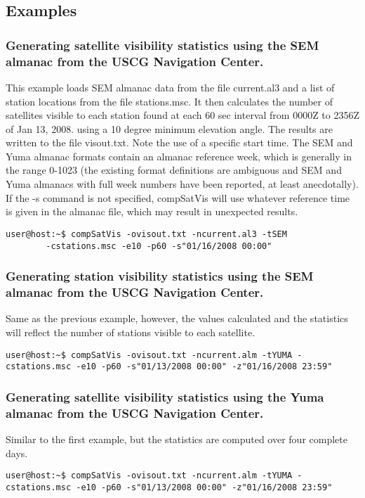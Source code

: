 \subsection{Examples}

\subsubsection{Generating satellite visibility statistics using the SEM almanac from the USCG Navigation Center.}
This example loads SEM almanac data from the file current.al3 and a list of station locations from the file stations.msc. It then calculates the number of satellites visible to each station found at each 60 sec interval from 0000Z to 2356Z of Jan 13, 2008. using a 10 degree minimum elevation angle. The results are written to the file visout.txt. Note the use of a specific start time. The SEM and Yuma almanac formats contain an almanac reference week, which is generally in the range 0-1023 (the existing format definitions are ambiguous and SEM and Yuma almanacs with full week numbers have been reported, at least anecdotally). If the -s command is not specified, compSatVis will use whatever reference time is given in the almanac file, which may result in unexpected results.
\begin{verbatim}
user@host:~$ compSatVis -ovisout.txt -ncurrent.al3 -tSEM 
        -cstations.msc -e10 -p60 -s"01/16/2008 00:00"
\end{verbatim}

\subsubsection{Generating station visibility statistics using the SEM almanac from the USCG Navigation Center.}
Same as the previous example, however, the values calculated and the statistics will reflect the number of stations visible to each satellite.
\begin{verbatim}
user@host:~$ compSatVis -ovisout.txt -ncurrent.alm -tYUMA -cstations.msc -e10 -p60 -s"01/13/2008 00:00" -z"01/16/2008 23:59"
\end{verbatim}

\subsubsection{Generating satellite visibility statistics using the Yuma almanac from the USCG Navigation Center.}
Similar to the first example, but the statistics are computed over four complete days.
\begin{verbatim}
user@host:~$ compSatVis -ovisout.txt -ncurrent.alm -tYUMA -cstations.msc -e10 -p60 -s"01/13/2008 00:00" -z"01/16/2008 23:59"
\end{verbatim}

